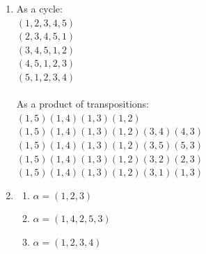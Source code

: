 \documentclass{article}
\begin{document}
\begin{enumerate}
        \item As a cycle: \\
                $(1, 2, 3, 4, 5)$\\
                $(2, 3, 4, 5, 1)$\\
                $(3, 4, 5, 1, 2)$\\
                $(4, 5, 1, 2, 3)$\\
                $(5, 1, 2, 3, 4)$\\\\ 
        As a product of transpositions:\\
        $(1, 5)(1, 4)(1, 3)(1, 2)$\\
        $(1, 5)(1, 4)(1, 3)(1, 2)(3, 4)(4, 3)$\\
        $(1, 5)(1, 4)(1, 3)(1, 2)(3, 5)(5, 3)$\\
        $(1, 5)(1, 4)(1, 3)(1, 2)(3, 2)(2, 3)$\\
        $(1, 5)(1, 4)(1, 3)(1, 2)(3, 1)(1, 3)$\\

        \item
            \begin{enumerate}[label=(\alph*)]
                \item $\alpha = (1, 2, 3)$
                
                \item $\alpha = (1, 4, 2, 5, 3)$
                
                \item $\alpha = (1, 2, 3, 4)$
            \end{enumerate}
\end{enumerate}
\end{document}
